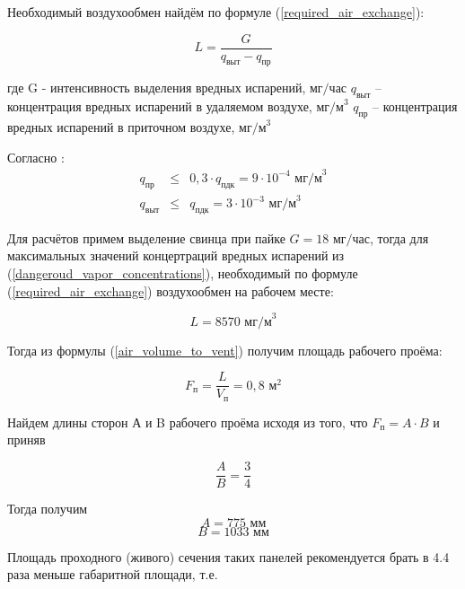 Необходимый воздухообмен найдём по формуле (\ref{required_air_exchange}):

\begin{equation}
\label{required_air_exchange}
    L = \frac{G}{q_\text{выт} - q_\text{пр}}
\end{equation}

где G - интенсивность выделения вредных испарений, $\text{мг/час}$
$q_\text{выт}$ – концентрация вредных испарений в удаляемом воздухе, $\text{мг/м}^3$
$q_\text{пр}$ – концентрация вредных испарений в приточном воздухе, $\text{мг/м}^3$

Согласно \cite[п. 2.15]{ecology_san_norm_245_71}:
\begin{equation}
\label{dangeroud_vapor_concentrations}
    \begin{array}{lcr}
        q_\text{пр}  & \leq & 0,3 \cdot q_\text{пдк} = 9 \cdot 10^{-4} \text{ мг/м}^3 \\
        q_\text{выт} & \leq &           q_\text{пдк} = 3 \cdot 10^{-3} \text{ мг/м}^3
    \end{array}
\end{equation}

Для расчётов примем выделение свинца при пайке $G = 18 \text{ мг/час}$,
тогда для максимальных значений концертраций вредных испарений из
(\ref{dangeroud_vapor_concentrations}), необходимый по формуле (\ref{required_air_exchange})
воздухообмен на рабочем месте:

$$
    L = 8570 \text{ мг/м}^3
$$

Тогда из формулы (\ref{air_volume_to_vent}) получим площадь рабочего проёма:

\begin{equation}
\label{working_window_area}
    F_\text{п} = \frac{L}{V_\text{п}} = 0,8 \text{ м}^2
\end{equation}

Найдем длины сторон А и B рабочего проёма исходя из того, что $F_\text{п}  = A \cdot B$ и приняв

\begin{equation}
\label{working_window_area_sides_ratio}
    \frac{A}{B} = \frac{3}{4}
\end{equation}

Тогда получим
$$
    A = 775 \text{ мм}
$$
$$
    B = 1033 \text{ мм}
$$


Площадь проходного (живого) сечения таких панелей рекомендуется брать в 4.4
раза меньше габаритной площади, т.е.

